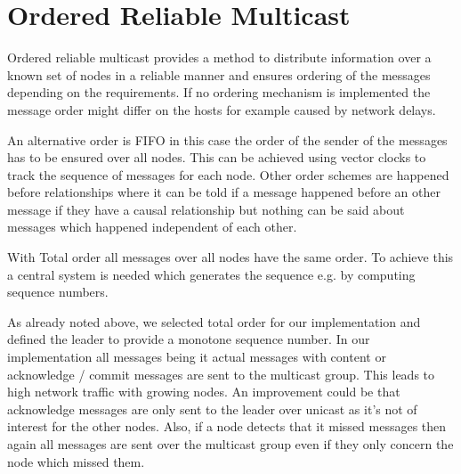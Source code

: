 \section{Ordered Reliable Multicast}\label{sec:OrderedReliableMulticast}
Ordered reliable multicast provides a method to distribute information over a known set of nodes in a reliable manner and ensures ordering of the messages depending on the requirements. 
If no ordering mechanism is implemented the message order might differ on the hosts for example caused by network delays. 

An alternative order is \ac{FIFO} in this case the order of the sender of the messages has to be ensured over all nodes. This can be achieved using vector clocks to track the sequence of messages for each node. Other order schemes are happened before relationships where it can be told if a message happened before an other message if they have a causal relationship but nothing can be said about messages which happened independent of each other. 

With Total order all messages over all nodes have the same order. To achieve this a central system is needed which generates the sequence e.g. by computing sequence numbers.

As already noted above, we selected total order for our implementation and defined the leader to provide a monotone sequence number. In our implementation all messages being it actual messages with content or acknowledge / commit messages are sent to the multicast group. This leads to high network traffic with growing nodes. An improvement could be that acknowledge messages are only sent to the leader over unicast as it's not of interest for the other nodes. 
Also, if a node detects that it missed messages then again all messages are sent over the multicast group even if they only concern the node which missed them.